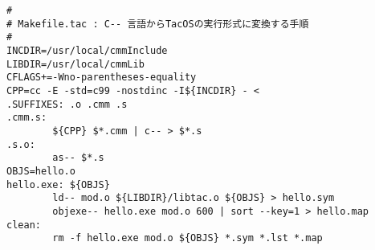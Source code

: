 \begin{itemize}
\begin{mylist}
\begin{verbatim}
#
# Makefile.tac : C-- 言語からTacOSの実行形式に変換する手順
#
INCDIR=/usr/local/cmmInclude
LIBDIR=/usr/local/cmmLib
CFLAGS+=-Wno-parentheses-equality
CPP=cc -E -std=c99 -nostdinc -I${INCDIR} - < 
.SUFFIXES: .o .cmm .s
.cmm.s:
        ${CPP} $*.cmm | c-- > $*.s
.s.o:
        as-- $*.s
OBJS=hello.o
hello.exe: ${OBJS}
        ld-- mod.o ${LIBDIR}/libtac.o ${OBJS} > hello.sym
        objexe-- hello.exe mod.o 600 | sort --key=1 > hello.map
clean:
        rm -f hello.exe mod.o ${OBJS} *.sym *.lst *.map
\end{verbatim}
\end{mylist}

\end{itemize}
